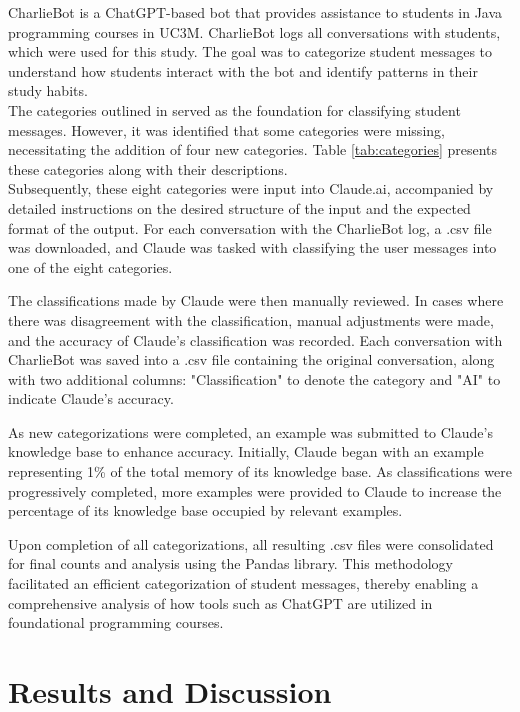 \documentclass[conference]{IEEEtran}
\begin{document}
CharlieBot is a ChatGPT-based bot that provides assistance to students in
Java programming courses in UC3M. CharlieBot logs all conversations with
students, which were used for this study. The goal was to categorize student
messages to understand how students interact with the bot and identify patterns
in their study habits.
\\
The categories outlined in \cite{10.1007/978-3-031-64299-9_20} served as the
foundation for classifying student messages. However, it was identified that
some categories were missing, necessitating the addition of four new categories.
Table \ref{tab:categories} presents these categories along with their
descriptions.
\\
Subsequently, these eight categories were input into Claude.ai, accompanied by
detailed instructions on the desired structure of the input and the expected
format of the output. For each conversation with the CharlieBot log, a .csv file
was downloaded, and Claude was tasked with classifying the user messages into
one of the eight categories.

The classifications made by Claude were then manually reviewed. In cases where
there was disagreement with the classification, manual adjustments were made,
and the accuracy of Claude's classification was recorded. Each conversation
with CharlieBot was saved into a .csv file containing the original conversation,
along with two additional columns: "Classification" to denote the category and
"AI" to indicate Claude's accuracy.

As new categorizations were completed, an example was submitted to Claude's
knowledge base to enhance accuracy. Initially, Claude began with an example
representing 1\% of the total memory of its knowledge base. As classifications
were progressively completed, more examples were provided to Claude to increase
the percentage of its knowledge base occupied by relevant examples.

Upon completion of all categorizations, all resulting .csv files were consolidated
for final counts and analysis using the Pandas library. This methodology
facilitated an efficient categorization of student messages, thereby enabling
a comprehensive analysis of how tools such as ChatGPT are utilized in foundational
programming courses.

\section{Results and Discussion}
\end{document}
